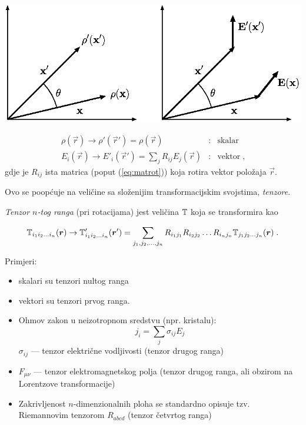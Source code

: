 \vspace*{2ex}
\centerline{\includegraphics[scale=0.8]{pics/skalarvektor.eps}}

\begin{eqnarray*}
 \rho(\vec{r}) \to \rho'(\vec{r}') = \rho(\vec{r}) & : & \textrm{skalar} \\
  E_i(\vec{r}) \to E'_i(\vec{r}') = \sum_j R_{ij}E_j(\vec{r})
   & : & \textrm{vektor} \;,
\end{eqnarray*}
gdje je $R_{ij}$ ista matrica (poput (\ref{eq:matrot})) koja rotira
vektor položaja $\vec{r}$.

  Ovo se poopćuje na veličine sa složenijim transformacijskim svojstima,
\emph{tenzore}. 

\begin{definicija}
\label{def:tenzor}

\emph{Tenzor $n$-tog ranga} (pri rotacijama)  jest veličina $\mathbb{T}$  koja
se transformira kao

\begin{displaymath}
 \bbtensor{T}_{i_1 i_2 \ldots i_n}(\vec{r}) \to \bbtensor{T}'_{i_1 i_2 \ldots i_n}(\vec{r}') =
\sum_{j_1, j_2, \ldots, j_n}
  R_{i_1 j_1}  R_{i_2 j_2} \ldots  R_{i_n j_n} \bbtensor{T}_{j_1 j_2 \ldots j_n}(\vec{r})
 \; . 
\end{displaymath}
\end{definicija}


Primjeri:
\begin{itemize}
\item skalari su tenzori nultog ranga
\item vektori su tenzori prvog ranga.
\item Ohmov zakon u neizotropnom sredstvu (npr. kristalu): 
\begin{equation*}
j_i = \sum_j \sigma_{ij} E_j
\end{equation*}
$\sigma_{ij}$ --- tenzor električne vodljivosti (tenzor drugog ranga)

\item $F_{\mu\nu}$ --- tenzor elektromagnetskog polja (tenzor drugog
ranga, ali obzirom na Lorentzove transformacije)

\item Zakrivljenost $n$-dimenzionalnih ploha se standardno opisuje
tzv. Riemannovim tenzorom $R_{abcd}$  (tenzor četvrtog ranga)
\end{itemize}



